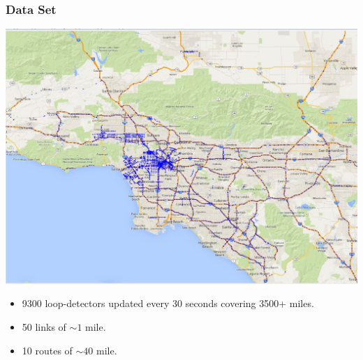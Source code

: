 \documentclass[t]{beamer}
\begin{document}
\begin{frame}\frametitle{Data Set}
\vspace{-0.25in}
\begin{center}
	\includegraphics[scale=0.4]{LA-map.jpg}
\end{center}
\begin{itemize}
\item 9300 loop-detectors updated every 30 seconds covering 3500+ miles.
\item<2-> 50 links of $\sim 1$ mile.
\item<3-> 10 routes of $\sim 40$ mile.
\end{itemize}
\end{frame}
\end{document}
